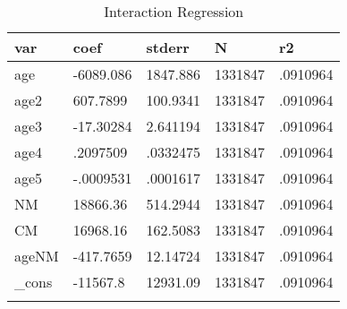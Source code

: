 \documentclass{article}
\begin{document}
\begin{table}[tbp] \centering
{}

\caption{Interaction Regression}
\begin{tabularx}{\textwidth}{lCCCC}

\toprule
{var}&{coef}&{stderr}&{N}&{r2} \tabularnewline
\midrule\addlinespace[1.5ex]
age&-6089.086&1847.886&1331847&.0910964 \tabularnewline
age2&607.7899&100.9341&1331847&.0910964 \tabularnewline
age3&-17.30284&2.641194&1331847&.0910964 \tabularnewline
age4&.2097509&.0332475&1331847&.0910964 \tabularnewline
age5&-.0009531&.0001617&1331847&.0910964 \tabularnewline
NM&18866.36&514.2944&1331847&.0910964 \tabularnewline
CM&16968.16&162.5083&1331847&.0910964 \tabularnewline
ageNM&-417.7659&12.14724&1331847&.0910964 \tabularnewline
\_cons&-11567.8&12931.09&1331847&.0910964 \tabularnewline
\bottomrule \addlinespace[1.5ex]

\end{tabularx}
\end{table}
\end{document}
